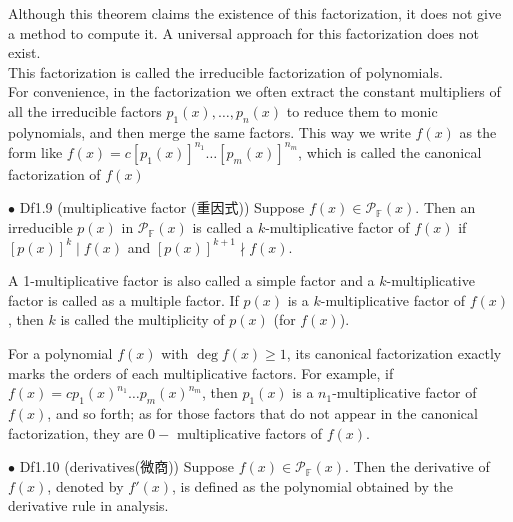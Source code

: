 \documentclass{article}
\begin{document}
\begin{Rmk}{}
    Although this theorem claims the existence of this factorization, it does not give a method to compute it. A universal approach for this factorization does not exist.\\
    \textcolor{Df}{This factorization is called the irreducible factorization of polynomials.}\\
    \textcolor{Df}{For convenience, in the factorization we often extract the constant multipliers of all the irreducible factors $p_1(x), \dots, p_n(x)$ to reduce them to monic polynomials, and then merge the same factors. This way we write $f(x)$ as the form like $f(x) = c[p_1(x)]^{n_1}\dots [p_m(x)]^{n_m}$, which is called the canonical factorization of $f(x)$}
\end{Rmk}

\begin{Df}{$\bullet$ Df1.9 (multiplicative factor (重因式))}
    Suppose $f(x)\in\mathcal{P}_\mathbb{F}(x)$. Then an irreducible $p(x)$ in $\mathcal{P}_\mathbb{F}(x)$ is called a $k$-multiplicative factor of $f(x)$ if $[p(x)]^k\mid f(x)$ and $[p(x)]^{k+1}\nmid f(x)$.
\end{Df}

\begin{Rmk}{}
    \begin{compactitem}
        \item \textcolor{Df}{A 1-multiplicative factor is also called a simple factor and a $k$-multiplicative factor is called as a multiple factor. If $p(x)$ is a $k$-multiplicative factor of $f(x)$, then $k$ is called the multiplicity of $p(x)$ (for $f(x)$).}
        \item \textcolor{Th}{For a polynomial $f(x)$ with $\deg f(x)\geq 1$, its canonical factorization exactly marks the orders of each multiplicative factors. For example, if $f(x) = c p_1(x)^{n_1}\dots p_m(x)^{n_m}$, then $p_1(x)$ is a $n_1$-multiplicative factor of $f(x)$, and so forth; as for those factors that do not appear in the canonical factorization, they are $0-$ multiplicative factors of $f(x)$.}
    \end{compactitem}
\end{Rmk}

\begin{Df}{$\bullet$ Df1.10 (derivatives(微商))}
    Suppose $f(x)\in\mathcal{P}_\mathbb{F}(x)$. Then the derivative of $f(x)$, denoted by $f'(x)$, is defined as the polynomial obtained by the derivative rule in analysis.
\end{Df}
\end{document}
